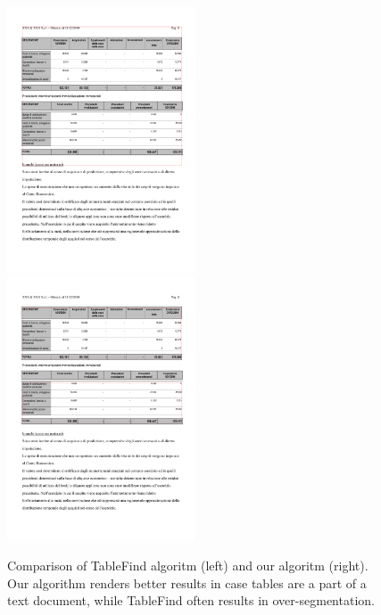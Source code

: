 \begin{figure}[t]
\centering
\includegraphics[width=15em]{img/results/tableFind2Tess.jpg}
\includegraphics[width=15em]{img/results/tableFind2Us.png}
\caption{Comparison of TableFind algoritm (left) and our algoritm (right). Our algorithm renders better results in case tables are a part of a text document, while TableFind often results in over-segmentation.}
\label{fig:tableFindComparison_Ours}
\end{figure}

